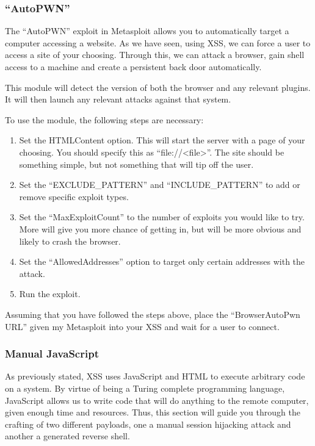 			\subsubsection{``AutoPWN''}
				The ``AutoPWN'' exploit in Metasploit allows you to automatically target a computer accessing a website.
				As we have seen, using XSS, we can force a user to access a site of your choosing.
				Through this, we can attack a browser, gain shell access to a machine and create a persistent back door automatically.

				This module will detect the version of both the browser and any relevant plugins.
				It will then launch any relevant attacks against that system.

				To use the module, the following steps are necessary:
				\begin{enumerate}
					\item Set the HTMLContent option.
						This will start the server with a page of your choosing.
						You should specify this as ``file://<file>''.
						The site should be something simple, but not something that will tip off the user.
					\item Set the ``EXCLUDE\_PATTERN'' and ``INCLUDE\_PATTERN'' to add or remove specific exploit types.
					\item Set the ``MaxExploitCount'' to the number of exploits you would like to try.
						More will give you more chance of getting in, but will be more obvious and likely to crash the browser.
					\item Set the ``AllowedAddresses'' option to target only certain addresses with the attack.
					\item Run the exploit.
				\end{enumerate}

				Assuming that you have followed the steps above, place the ``BrowserAutoPwn URL'' given my Metasploit into your XSS and wait for a user to connect.


			\subsubsection{Manual JavaScript}
				As previously stated, XSS uses JavaScript and HTML to execute arbitrary code on a system.
				By virtue of being a Turing complete programming language, JavaScript allows us to write code that will do anything to the remote computer, given enough time and resources.
				Thus, this section will guide you through the crafting of two different payloads, one a manual session hijacking attack and another a generated reverse shell.

